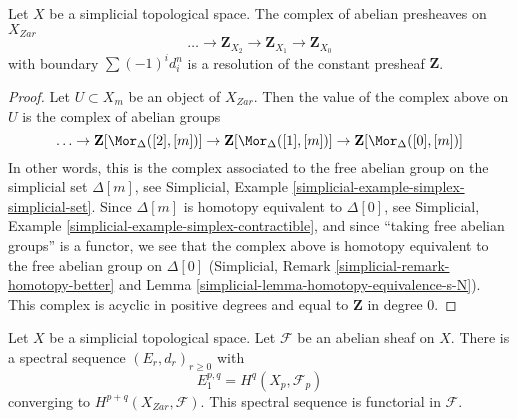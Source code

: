 \begin{lemma}
\label{lemma-simplicial-resolution-Z}
Let $X$ be a simplicial topological space. The complex of
abelian presheaves on $X_{Zar}$
$$
\ldots \to \mathbf{Z}_{X_2} \to \mathbf{Z}_{X_1} \to \mathbf{Z}_{X_0}
$$
with boundary $\sum (-1)^i d^n_i$ is a resolution
of the constant presheaf $\mathbf{Z}$.
\end{lemma}

\begin{proof}
Let $U \subset X_m$ be an object of $X_{Zar}$. Then the value of
the complex above on $U$ is the complex of abelian groups
$$
\ldots \to
\mathbf{Z}[\Mor_\Delta([2], [m])] \to
\mathbf{Z}[\Mor_\Delta([1], [m])] \to
\mathbf{Z}[\Mor_\Delta([0], [m])]
$$
In other words, this is the complex associated to the
free abelian group on the simplicial set $\Delta[m]$, see
Simplicial, Example \ref{simplicial-example-simplex-simplicial-set}.
Since $\Delta[m]$ is homotopy equivalent to $\Delta[0]$, see
Simplicial, Example \ref{simplicial-example-simplex-contractible},
and since ``taking free abelian groups'' is a functor,
we see that the complex above is homotopy equivalent to
the free abelian group on $\Delta[0]$
(Simplicial, Remark \ref{simplicial-remark-homotopy-better} and
Lemma \ref{simplicial-lemma-homotopy-equivalence-s-N}).
This complex is acyclic in positive degrees
and equal to $\mathbf{Z}$ in degree $0$.
\end{proof}

\begin{lemma}
\label{lemma-simplicial-sheaf-cohomology}
Let $X$ be a simplicial topological space. Let $\mathcal{F}$ be an abelian
sheaf on $X$. There is a spectral sequence $(E_r, d_r)_{r \geq 0}$ with
$$
E_1^{p, q} = H^q(X_p, \mathcal{F}_p)
$$
converging to $H^{p + q}(X_{Zar}, \mathcal{F})$.
This spectral sequence is functorial in $\mathcal{F}$.
\end{lemma}

